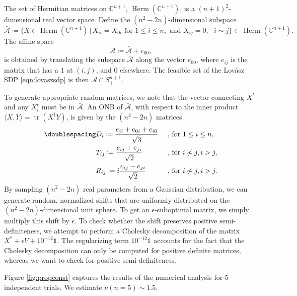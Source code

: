 The set of Hermitian matrices on $\mathbb{C}^{n+1}$, $\operatorname{Herm}(\mathbb{C}^{n+1})$, is a $(n+1)^2$-dimensional real vector space.
Define the $(n^2-2n)$-dimensional subspace
\begin{equation*}
\bar{\mathcal{A}}\coloneqq \{X\in\operatorname{Herm}(\mathbb{C}^{n+1}) \, \vert \, X_{ii}=X_{0i} \text{ for } 1\leq i \leq n, \text{ and } X_{ij}=0,\text{ } i\sim j\}\subset{\operatorname{Herm}(\mathbb{C}^{n+1})}.
\end{equation*}
The affine space
\begin{equation*}
\mathcal{A}\coloneqq \bar{\mathcal{A}}+e_{00},
\end{equation*}
is obtained by translating the subspace $\bar{\mathcal{A}}$ along the vector $e_{00}$, where $e_{ij}$ is the matrix that has a $1$ at $(i,j)$, and $0$ elsewhere. The feasible set of the Lovász SDP \ref{eqn:lovaszsdp} is then $\mathcal{A}\cap S_{+}^{n+1}$.

To generate appropriate random matrices, we note that the vector connecting $X^{*}$ and any $X_i^{\epsilon}$ must be in $\bar{\mathcal{A}}$. An ONB of $\bar{\mathcal{A}}$, with respect to the inner product $\langle X,Y\rangle=\operatorname{tr}(X^{\dag}Y)$, is given by the $(n^2-2n)$ matrices
\begin{alignat*}{2}
\doublespacing
& D_i \coloneqq \frac{e_{ii}+e_{0i}+e_{i0}}{\sqrt{3}}&& \text{ , for } 1\leq i\leq n,\\
& T_{ij} \coloneqq \frac{e_{ij}+e_{ji}}{\sqrt{2}}  && \text{ , for } i \not\sim j, i>j,\\
& R_{ij} \coloneqq i\frac{e_{ij}-e_{ji}}{\sqrt{2}} && \text{ , for } i\not\sim j, i>j.
\end{alignat*}
\onehalfspacing
By sampling $(n^2-2n)$ real parameters from a Gaussian distribution, we can generate random, normalized shifts that are uniformly distributed on the $(n^2-2n)$-dimensional unit sphere. To get an $\epsilon$-suboptimal matrix, we simply multiply this shift by $\epsilon$. To check whether the shift preserves positive semi-definiteness, we attempt to perform a Cholesky decomposition of the matrix $X^{*}+\epsilon V+10^{-12}\mathbb{1}$. The regularizing term $10^{-12}\mathbb{1}$ accounts for the fact that the Cholesky decomposition can only be computed for positive definite matrices, whereas we want to check for positive semi-definiteness.

Figure \ref{fig:propconst} captures the results of the numerical analysis for $5$ independent trials. We estimate $\nu(n=5)\sim 1.5$.

